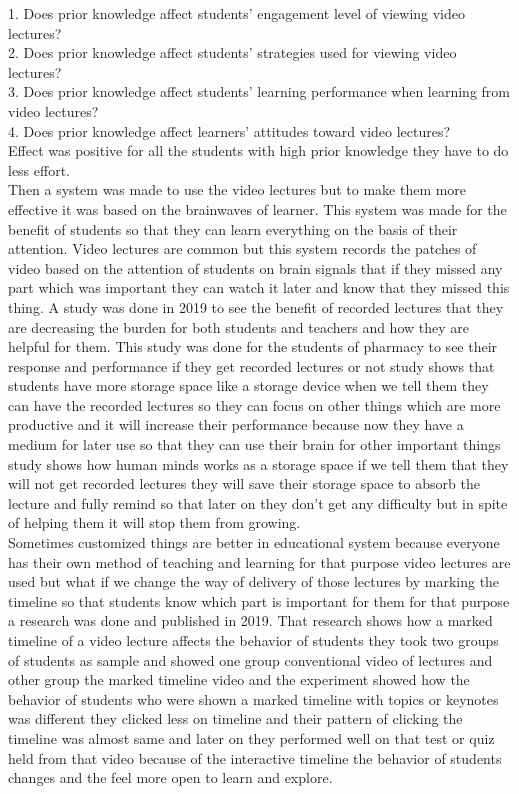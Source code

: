 1. Does prior knowledge affect students’ engagement level of viewing video lectures?\\
2. Does prior knowledge affect students’ strategies used for viewing video lectures?\\
3. Does prior knowledge affect students’ learning performance when learning from video lectures?\\
4. Does prior knowledge affect learners’ attitudes toward video lectures?\\
Effect was positive for all the students with high prior knowledge they have to do less effort.\cite{Li2019}\\
Then a system was made to use the video lectures but to make them more effective it was based on the brainwaves of learner. This system was made for the benefit of students so that they can learn everything on the basis of their attention. Video lectures are common but this system records the patches of video based on the attention of students on brain signals that if they missed any part which was important they can watch it later and know that they missed this thing.\cite{Lin2019}
A study was done in 2019 to see the benefit of recorded lectures that they are decreasing the burden for both students and teachers and how they are helpful for them. This study was done for the students of pharmacy to see their response and performance if they get recorded lectures or not study shows that students have more storage space like a storage device when we tell them they can have the recorded lectures so they can focus on other things which are more productive and it will increase their performance because now they have a medium for later use so that they can use their brain for other important things study shows how human minds works as a storage space if we tell them that they will not get recorded lectures they will save their storage space to absorb the lecture and fully remind so that later on they don't get any difficulty but in spite of helping them it will stop them from growing.\cite{Patel2019}\\
Sometimes customized things are better in educational system because everyone has their own method of teaching and learning for that purpose video lectures are used but what if we change the way of delivery of those lectures by marking the timeline so that students know which part is important for them for that purpose a research was done and published in 2019. That research shows how a marked timeline of a video lecture affects the behavior of students they took two groups of students as sample and showed one group conventional video of lectures and other group the marked timeline video and the experiment showed how the behavior of students who were shown a marked timeline with topics or keynotes was different they clicked less on timeline and their pattern of clicking the timeline was almost same and later on they performed well on that test or quiz held from that video because of the interactive timeline the behavior of students changes and the feel more open to learn and explore.\cite{Pimentel2019}\\
